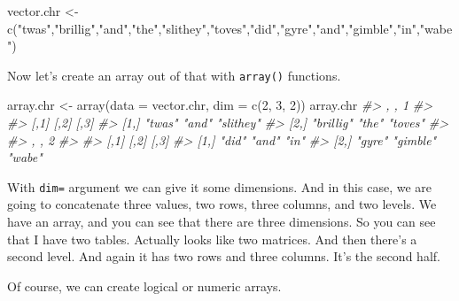 \documentclass[
]{book}
\newenvironment{Shaded}{\begin{snugshade}}{\end{snugshade}}
\newcommand{\AttributeTok}[1]{\textcolor[rgb]{0.77,0.63,0.00}{#1}}
\newcommand{\CommentTok}[1]{\textcolor[rgb]{0.56,0.35,0.01}{\textit{#1}}}
\newcommand{\DecValTok}[1]{\textcolor[rgb]{0.00,0.00,0.81}{#1}}
\newcommand{\FunctionTok}[1]{\textcolor[rgb]{0.00,0.00,0.00}{#1}}
\newcommand{\NormalTok}[1]{#1}
\newcommand{\OtherTok}[1]{\textcolor[rgb]{0.56,0.35,0.01}{#1}}
\newcommand{\StringTok}[1]{\textcolor[rgb]{0.31,0.60,0.02}{#1}}
\begin{document}
\begin{Shaded}
\begin{Highlighting}[]
\NormalTok{vector.chr }\OtherTok{\textless{}{-}} \FunctionTok{c}\NormalTok{(}\StringTok{"twas"}\NormalTok{,}\StringTok{"brillig"}\NormalTok{,}\StringTok{"and"}\NormalTok{,}\StringTok{"the"}\NormalTok{,}\StringTok{"slithey"}\NormalTok{,}\StringTok{"toves"}\NormalTok{,}\StringTok{"did"}\NormalTok{,}\StringTok{"gyre"}\NormalTok{,}\StringTok{"and"}\NormalTok{,}\StringTok{"gimble"}\NormalTok{,}\StringTok{"in"}\NormalTok{,}\StringTok{"wabe"}\NormalTok{)}
\end{Highlighting}
\end{Shaded}

Now let's create an array out of that with \texttt{array()} functions.

\begin{Shaded}
\begin{Highlighting}[]
\NormalTok{array.chr }\OtherTok{\textless{}{-}} \FunctionTok{array}\NormalTok{(}\AttributeTok{data =}\NormalTok{ vector.chr, }\AttributeTok{dim =} \FunctionTok{c}\NormalTok{(}\DecValTok{2}\NormalTok{, }\DecValTok{3}\NormalTok{, }\DecValTok{2}\NormalTok{))}
\NormalTok{array.chr}
\CommentTok{\#\textgreater{} , , 1}
\CommentTok{\#\textgreater{} }
\CommentTok{\#\textgreater{}      [,1]      [,2]  [,3]     }
\CommentTok{\#\textgreater{} [1,] "twas"    "and" "slithey"}
\CommentTok{\#\textgreater{} [2,] "brillig" "the" "toves"  }
\CommentTok{\#\textgreater{} }
\CommentTok{\#\textgreater{} , , 2}
\CommentTok{\#\textgreater{} }
\CommentTok{\#\textgreater{}      [,1]   [,2]     [,3]  }
\CommentTok{\#\textgreater{} [1,] "did"  "and"    "in"  }
\CommentTok{\#\textgreater{} [2,] "gyre" "gimble" "wabe"}
\end{Highlighting}
\end{Shaded}

With \texttt{dim=} argument we can give it some dimensions. And in this case, we are going to concatenate three values, two rows, three columns, and two levels. We have an array, and you can see that there are three dimensions. So you can see that I have two tables. Actually looks like two matrices. And then there's a second level. And again it has two rows and three columns. It's the second half.

Of course, we can create logical or numeric arrays.
\end{document}
